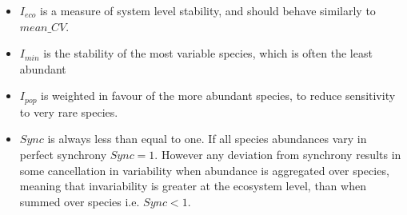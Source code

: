 \begin{itemize}
	\item $I_{eco}$ is a measure of system level stability, and should behave similarly to $mean\_CV$.
	\item $I_{min}$ is the stability of the most variable species, which is often the least abundant \cite{montoya2016invariability}
	\item $I_{pop}$ is weighted in favour of the more abundant species, to reduce sensitivity to very rare species.
	\item $Sync$ is always less than equal to one. If all species abundances vary in perfect synchrony $Sync=1$. However any deviation from synchrony results in some cancellation in variability when abundance is aggregated over species, meaning that invariability is greater at the ecosystem level, than when summed over species i.e. $Sync<1$.
\end{itemize}

